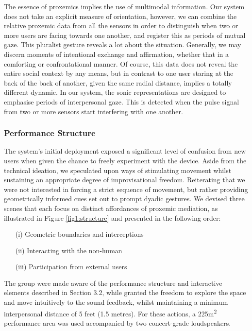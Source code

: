 The essence of proxemics implies the use of multimodal information. Our system does not take an explicit measure of orientation, however, we can combine the relative proxemic data from all the sensors in order to distinguish when two or more users are facing towards one another, and register this as periods of mutual gaze. This pluralist gesture reveals a lot about the situation. Generally, we may discern moments of intentional exchange and affirmation, whether that in a comforting or confrontational manner. Of course, this data does not reveal the entire social context by any means, but in contrast to one user staring at the back of the back of another, given the same radial distance, implies a totally different dynamic. In our system, the sonic representations are designed to emphasise periods of interpersonal gaze. This is detected when the pulse signal from two or more sensors start interfering with one another.

\subsubsection{Performance Structure}
\label{sec:structure}

The system's initial deployment exposed a significant level of confusion from new users when given the chance to freely experiment with the device. Aside from the technical ideation, we speculated upon ways of stimulating movement whilst sustaining an appropriate degree of improvisational freedom. Reiterating that we were not interested in forcing a strict sequence of movement, but rather providing geometrically informed cues set out to prompt dyadic gestures. We devised three scenes that each focus on distinct affordances of proxemic mediation, as illustrated in Figure \ref{fig1:structure} and presented in the following order:

\begin{itemize}
    \item[(i)] Geometric boundaries and interceptions
    \item[(ii)] Interacting with the non-human
    \item[(iii)] Participation from external users
\end{itemize}

The group were made aware of the performance structure and interactive elements described in Section 3.2, while granted the freedom to explore the space and move intuitively to the sound feedback, whilst maintaining a minimum interpersonal distance of 5 feet (1.5 metres). For these actions, a 225m\textsuperscript{2} performance area was used accompanied by two concert-grade loudspeakers.

